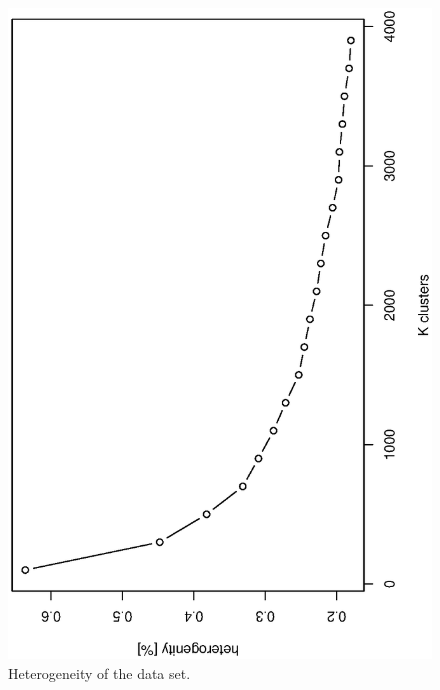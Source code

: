 \begin{figure}
\centering
\includegraphics[width=\textwidth]{graphics/heterogenity}
\caption{Heterogeneity of the data set.}
\label{fig:heterogeneity_kmean}
\end{figure}

